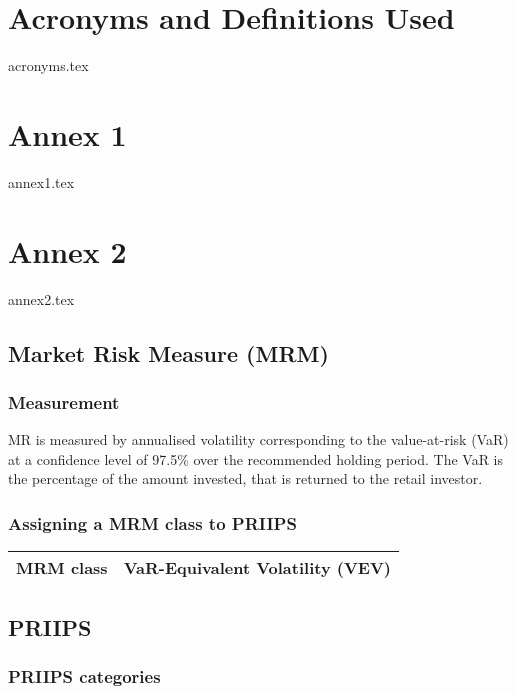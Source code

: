 \documentclass{report}
\begin{document}
	
\tableofcontents

\part{Acronyms and Definitions Used}
{acronyms.tex}
\pagebreak

\part{Annex 1}

{annex1.tex}
\pagebreak

\part{Annex 2}

{annex2.tex}
\pagebreak

\chapter{Market Risk Measure (MRM)}

\section{Measurement}
MR is measured by annualised volatility corresponding to the value-at-risk (VaR) at a confidence level of 97.5\% over the recommended holding period. The VaR is the percentage of the amount invested, that is returned to the retail investor.

\section{Assigning a MRM class to PRIIPS}

\begin{center}
	\begin{longtable}{| p{8cm} | p{9cm}}
		\hline
		\textbf{MRM class} & {VaR-Equivalent Volatility (VEV)}\\
		\hline
	\end{longtable}
\end{center}

\chapter{PRIIPS}

\section{PRIIPS categories}
\end{document}
